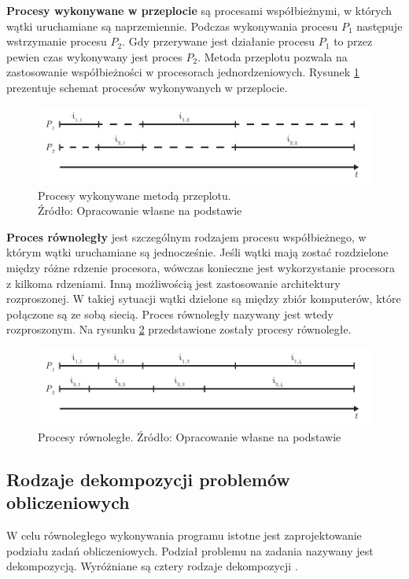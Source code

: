 \documentclass[12pt]{article}
\begin{document}
\textbf{Procesy wykonywane w przeplocie} są procesami współbieżnymi, w których wątki uruchamiane są naprzemiennie. Podczas wykonywania procesu $P_1$
następuje wstrzymanie procesu $P_2$. Gdy przerywane jest działanie procesu $P_1$ to przez pewien czas wykonywany
jest proces $P_2$. Metoda przeplotu pozwala na zastosowanie współbieżności w procesorach jednordzeniowych.
Rysunek \ref{fig:overlapping} prezentuje schemat procesów wykonywanych w przeplocie.

\begin{figure}[H]
    \centering
	\includegraphics[width=\textwidth]{overlapping.pdf}
    \caption{Procesy wykonywane metodą przeplotu.\\ Źródło: Opracowanie własne na podstawie \cite{wprowadzenie-do-obliczen-rownoleglych}}
    \label{fig:overlapping}
\end{figure}

\textbf{Proces równoległy} jest szczególnym rodzajem procesu współbieżnego, w którym wątki uruchamiane są jednocześnie. Jeśli wątki mają zostać
rozdzielone między różne rdzenie procesora, wówczas konieczne jest wykorzystanie procesora z kilkoma rdzeniami. Inną możliwością jest zastosowanie architektury
rozproszonej. W takiej sytuacji wątki dzielone są między zbiór komputerów, które połączone są ze sobą siecią. Proces równoległy nazywany jest wtedy rozproszonym.
Na rysunku \ref{fig:parallel} przedstawione zostały procesy równoległe.

\begin{figure}[H]
    \centering
	\includegraphics[width=\textwidth]{parallel.pdf}
    \caption{Procesy równoległe. Źródło: Opracowanie własne na podstawie \cite{wprowadzenie-do-obliczen-rownoleglych}}
    \label{fig:parallel}
\end{figure}

\subsection{Rodzaje dekompozycji problemów obliczeniowych}
W celu równoległego wykonywania programu istotne jest zaprojektowanie podziału zadań obliczeniowych. Podział problemu na
zadania nazywany jest dekompozycją. Wyróżniane są cztery rodzaje dekompozycji \cite{wprowadzenie-do-obliczen-rownoleglych}.
\end{document}
